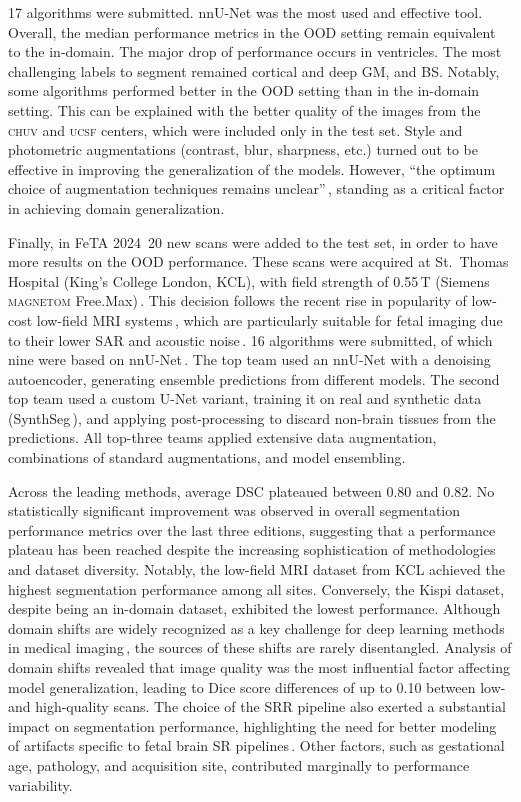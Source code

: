 17 algorithms were submitted. nnU-Net was the most used and effective tool. Overall, the median performance metrics in the OOD setting remain equivalent to the in-domain. The major drop of performance occurs in ventricles. The most challenging labels to segment remained cortical and deep GM, and BS. Notably, some algorithms performed better in the OOD setting than in the in-domain setting. This can be explained with the better quality of the images from the \textsc{chuv} and \textsc{ucsf} centers, which were included only in the test set. Style and photometric augmentations (contrast, blur, sharpness, etc.) turned out to be effective in improving the generalization of the models. However, \enquote{the optimum choice of augmentation techniques remains unclear}\,\cite{FeTA2022_review}, standing as a critical factor in achieving domain generalization.

Finally, in FeTA 2024\,\cite{FeTA2024_review, FeTA2024} 20 new scans were added to the test set, in order to have more results on the OOD performance. These scans were acquired at St.\ Thomas Hospital (King's College London, KCL), with field strength of 0.55\,T (Siemens \textsc{magnetom} Free.Max)\,\cite{FeTA2024_paper}. This decision follows the recent rise in popularity of low-cost low-field MRI systems\,\cite{Aviles2023}, which are particularly suitable for fetal imaging due to their lower SAR and acoustic noise\,\cite{Ponrartana2023}. 16 algorithms were submitted, of which nine were based on nnU-Net\,\cite{nnUNet, Isensee2021}. The top team used an nnU-Net with a denoising autoencoder, generating ensemble predictions from different models. The second top team used a custom U-Net variant, training it on real and synthetic data (SynthSeg\,\cite{Billot2023}), and applying post-processing to discard non-brain tissues from the predictions. All top-three teams applied extensive data augmentation, combinations of standard augmentations, and model ensembling.

Across the leading methods, average DSC plateaued between 0.80 and 0.82. No statistically significant improvement was observed in overall segmentation performance metrics over the last three editions, suggesting that a performance plateau has been reached despite the increasing sophistication of methodologies and dataset diversity. Notably, the low-field MRI dataset from KCL achieved the highest segmentation performance among all sites. Conversely, the Kispi dataset, despite being an in-domain dataset, exhibited the lowest performance. Although domain shifts are widely recognized as a key challenge for deep learning methods in medical imaging\,\cite{Dockes2021}, the sources of these shifts are rarely disentangled. Analysis of domain shifts revealed that image quality was the most influential factor affecting model generalization, leading to Dice score differences of up to 0.10 between low- and high-quality scans. The choice of the SRR pipeline also exerted a substantial impact on segmentation performance, highlighting the need for better modeling of artifacts specific to fetal brain SR pipelines\,\cite{Sanchez2024}. Other factors, such as gestational age, pathology, and acquisition site, contributed marginally to performance variability.

